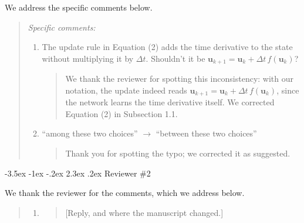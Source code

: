 \documentclass[sigleft]{letter}
\makeatletter
\newcounter{section}
\newcommand\section{\@startsection{section}{1}{\z@}%
                                  {-3.5ex \@plus -1ex \@minus -.2ex}%
                                  {2.3ex \@plus.2ex}%
                                  {\normalfont\Large\bfseries}}
\newcommand{\reviewerB}[1]{{\color{reviewerBcolor}#1}}
\newenvironment{quoteA}{\begin{quote}\itshape\color{reviewerAcolor}}{\end{quote}}
\newenvironment{quoteB}{\begin{quote}\itshape\color{reviewerBcolor}}{\end{quote}}
\newenvironment{reply}{\begin{quote}\upshape\color{black}}{\end{quote}}
\makeatother
\begin{document}
We address the specific comments below.
\begin{quoteA}
Specific comments:
\begin{enumerate}
\item[p. 4] The update rule in Equation (2) adds the time derivative to the state without multiplying it by $\Delta t$. Shouldn't it be $\bm u_{k+1} = \bm u_k + \Delta t\, f(\bm u_k)$?
\begin{reply}
We thank the reviewer for spotting this inconsistency: with our notation, the update indeed reads $\bm u_{k+1} = \bm u_k + \Delta t\, f(\bm u_k)$, since the network learns the time derivative itself.
We corrected Equation (2) in Subsection 1.1.
\end{reply}
\item[p. 12] ``among these two choices'' $\rightarrow$ ``between these two choices''
\begin{reply}
Thank you for spotting the typo; we corrected it as suggested.
\end{reply}
\end{enumerate}
\end{quoteA}

\reviewerB{\section{Reviewer \#2}}

We thank the reviewer for the comments, which we address below.

\begin{quoteB}
\begin{enumerate}
\item[Sec. 3] [Comment quoted verbatim.]
\begin{reply}
[Reply, and where the manuscript changed.]
\end{reply}
\end{enumerate}
\end{quoteB}
\end{document}
